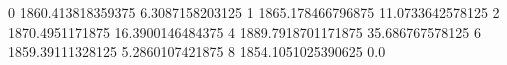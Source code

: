 0 1860.413818359375 6.3087158203125
1 1865.178466796875 11.0733642578125
2 1870.4951171875 16.3900146484375
4 1889.7918701171875 35.686767578125
6 1859.39111328125 5.2860107421875
8 1854.1051025390625 0.0
